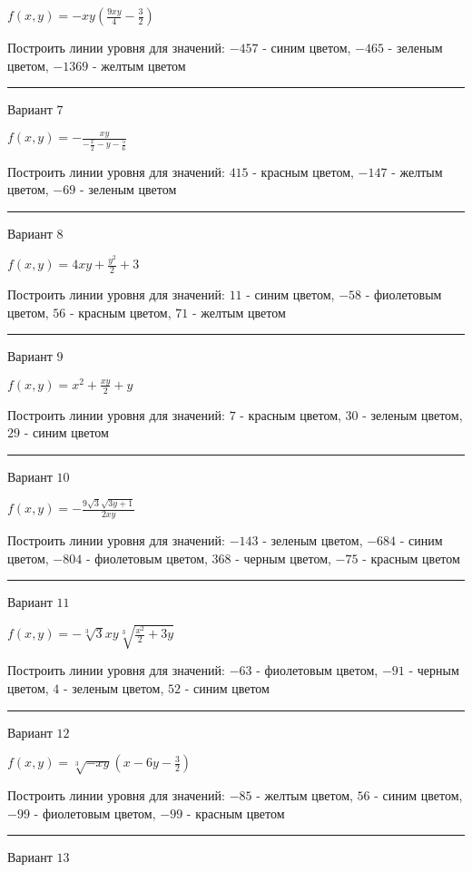 \documentclass[11pt]{report}
\begin{document}
$f(x, y) = - x y \left(\frac{9 x y}{4} - \frac{3}{2}\right)$

Построить линии уровня для значений: $-457$ - синим цветом, $-465$ - зеленым цветом, $-1369$ - желтым цветом
\begin{center}
\noindent\rule{8cm}{0.4pt}
\end{center}
Вариант $7$


$f(x, y) = - \frac{x y}{- \frac{x}{2} - y - \frac{5}{6}}$

Построить линии уровня для значений: $415$ - красным цветом, $-147$ - желтым цветом, $-69$ - зеленым цветом
\begin{center}
\noindent\rule{8cm}{0.4pt}
\end{center}
Вариант $8$


$f(x, y) = 4 x y + \frac{y^{2}}{2} + 3$

Построить линии уровня для значений: $11$ - синим цветом, $-58$ - фиолетовым цветом, $56$ - красным цветом, $71$ - желтым цветом
\begin{center}
\noindent\rule{8cm}{0.4pt}
\end{center}
Вариант $9$


$f(x, y) = x^{2} + \frac{x y}{2} + y$

Построить линии уровня для значений: $7$ - красным цветом, $30$ - зеленым цветом, $29$ - синим цветом
\begin{center}
\noindent\rule{8cm}{0.4pt}
\end{center}
Вариант $10$


$f(x, y) = - \frac{9 \sqrt{3} \sqrt{3 y + 1}}{2 x y}$

Построить линии уровня для значений: $-143$ - зеленым цветом, $-684$ - синим цветом, $-804$ - фиолетовым цветом, $368$ - черным цветом, $-75$ - красным цветом
\begin{center}
\noindent\rule{8cm}{0.4pt}
\end{center}
Вариант $11$


$f(x, y) = - \sqrt[3]{3} x y \sqrt[3]{\frac{x^{2}}{2} + 3 y}$

Построить линии уровня для значений: $-63$ - фиолетовым цветом, $-91$ - черным цветом, $4$ - зеленым цветом, $52$ - синим цветом
\begin{center}
\noindent\rule{8cm}{0.4pt}
\end{center}
Вариант $12$


$f(x, y) = \sqrt[3]{- x y} \left(x - 6 y - \frac{3}{2}\right)$

Построить линии уровня для значений: $-85$ - желтым цветом, $56$ - синим цветом, $-99$ - фиолетовым цветом, $-99$ - красным цветом
\begin{center}
\noindent\rule{8cm}{0.4pt}
\end{center}
Вариант $13$
\end{document}
